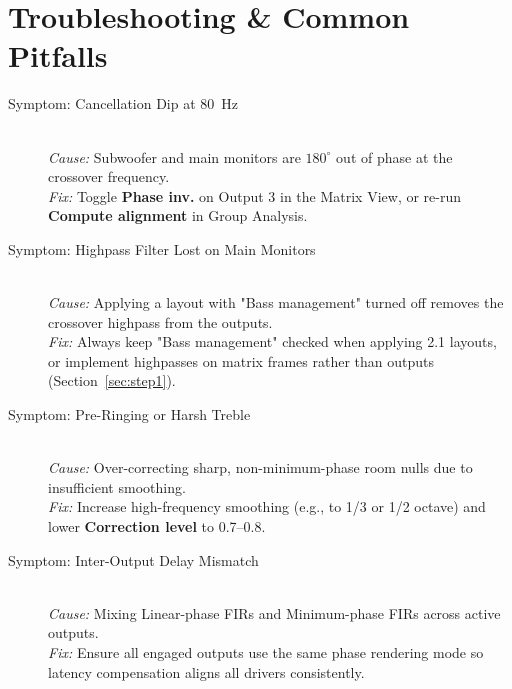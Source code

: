 \documentclass[11pt,a4paper]{article}
\begin{document}
\section*{Troubleshooting \& Common Pitfalls}

\begin{description}
  \item[Symptom: Cancellation Dip at \SI{80}{\hertz}] \hfill \\
  \emph{Cause:} Subwoofer and main monitors are $180^\circ$ out of phase at the crossover frequency.\\
  \emph{Fix:} Toggle \textbf{Phase inv.} on Output 3 in the Matrix View, or re-run \textbf{Compute alignment} in Group Analysis.

  \item[Symptom: Highpass Filter Lost on Main Monitors] \hfill \\
  \emph{Cause:} Applying a layout with "Bass management" turned off removes the crossover highpass from the outputs.\\
  \emph{Fix:} Always keep "Bass management" checked when applying 2.1 layouts, or implement highpasses on matrix frames rather than outputs (Section~\ref{sec:step1}).

  \item[Symptom: Pre-Ringing or Harsh Treble] \hfill \\
  \emph{Cause:} Over-correcting sharp, non-minimum-phase room nulls due to insufficient smoothing.\\
  \emph{Fix:} Increase high-frequency smoothing (e.g., to 1/3 or 1/2 octave) and lower \textbf{Correction level} to 0.7--0.8.

  \item[Symptom: Inter-Output Delay Mismatch] \hfill \\
  \emph{Cause:} Mixing Linear-phase FIRs and Minimum-phase FIRs across active outputs.\\
  \emph{Fix:} Ensure all engaged outputs use the same phase rendering mode so latency compensation aligns all drivers consistently.
\end{description}
\end{document}
